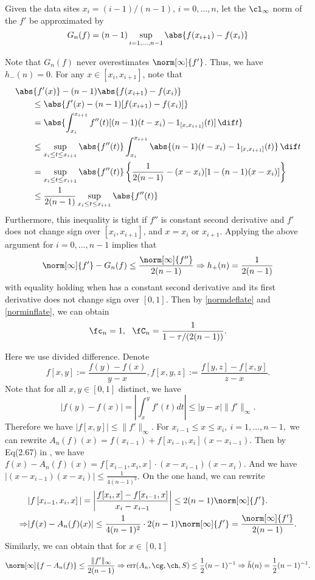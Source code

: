 Given the data sites $x_i=(i-1)/(n-1)$, $i=0, \ldots, n$, let the $\cl_\infty$ norm of the $f'$ be approximated by
\begin{equation}\label{estfirstderiv}
G_n(f) = (n-1) \sup_{i=1, \ldots, n-1} \abs{f(x_{i+1})-f(x_i)}
\end{equation}

Note that $G_n(f)$ never overestimates $\norm[\infty]{f'}$. Thus, we have
$h_{-}(n)=0.$
For any $x \in [x_{i}, x_{i+1}]$, note that
\begin{align*}
\MoveEqLeft{\abs{f'(x)} - (n-1) \abs{f(x_{i+1})-f(x_i)}} \\
 & \le \abs{f'(x) - (n-1)[f(x_{i+1})-f(x_i)]} \\
&=\abs{ \int_{x_i}^{x_{i+1}} f''(t) [(n-1)(t-x_i) -  1_{[x,x_{i+1}]}(t)] \, \dif t} \\
& \le \sup_{x_i \le t \le x_{i+1}} \abs{f''(t)} \int_{x_i}^{x_{i+1}} \abs{  (n-1)(t-x_i) -  1_{[x,x_{i+1}]}(t)} \, \dif t \\
&=\sup_{x_i \le t \le x_{i+1}} \abs{f''(t)} \left \{\frac{1}{2(n-1)} - (x-x_i)[1-(n-1)(x-x_i)] \right\} \\
&\le \frac{1}{2(n-1)}\sup_{x_i \le t \le x_{i+1}} \abs{f''(t)}
\end{align*}
Furthermore, this inequality is tight if $f''$ is constant second derivative and $f'$ does not change sign over $[x_{i}, x_{i+1}]$, and $x=x_i$ or $x_{i+1}$.  Applying the above argument for $i=0, \ldots, n-1$ implies that
\[
\norm[\infty]{f'} - G_n(f) \le \frac{\norm[\infty]{f''}}{2(n-1)} \Rightarrow h_{+}(n)=\frac{1}{2(n-1)}
\]
with equality holding when has a constant second derivative and its first derivative does not change sign over $[0,1]$.
Then by \eqref{normdeflate} and \eqref{norminflate}, we can obtain
\begin{equation}\label{inflaapprox}
\fc_n=1, \ \   \fC_n =\frac{1}{1 - \tau /(2(n-1))}.
\end{equation}

Here we use divided difference. Denote
$$f[x,y]:=\frac{f(y)-f(x)}{y-x},f[x,y,z]:=\frac{f[y,z]-f[x,y]}{z-x}.$$
Note that for all $x,y \in [0,1]$ distinct, we have
 $$|f(y)-f(x)|=\left|\int_{x}^{y}f'(t)dt\right| \leq |y-x|\|f'\|_{\infty}.$$
 Therefore we have $|f[x,y]|\leq \|f'\|_{\infty}.$
For $x_{i-1} \leq x \leq x_i, \ i=1, \ldots, n-1,$ we  can rewrite
$A_{n}(f)(x)=f\left(x_{i-1}\right)+f\left[x_{i-1},x_{i}\right]\left(x-x_{i-1}\right).$
Then by Eq(2.67) in \cite{walter}, we have
$
f(x)-A_{n}(f)(x)
=f\left[x_{i-1},x_{i},x\right]\cdot (x-x_{i-1})(x-x_i).
$
And we have
$\left|(x-x_{i-1})(x-x_{i})\right| \leq \frac{1}{4(n-1)^2}.$
On the one hand, we can rewrite
\begin{align*}&|f\left[x_{i-1},x_{i},x\right]|=\left|\frac{f[x_{i},x]-f[x_{i-1},x]}{x_i-x_{i-1}}\right|\leq2(n-1)\norm[\infty]{f'}.\\
\Rightarrow & |f(x)-A_{n}(f)(x)|\leq \frac{1}{4(n-1)^2}\cdot 2(n-1)\norm[\infty]{f'}=\frac{\norm[\infty]{f'}}{2(n-1)}.
\end{align*}
Similarly, we can obtain that for $x \in [0,1]$
$$\norm[\infty]{f-A_{n}(f)} \leq \frac{\|f'\|_{\infty}}{2(n-1)} \Rightarrow \err(A_n,\cg,\ch,S) \leq \frac{1}{2}(n-1)^{-1} \Rightarrow \tilde{h}(n)=\frac{1}{2}(n-1)^{-1}.$$

